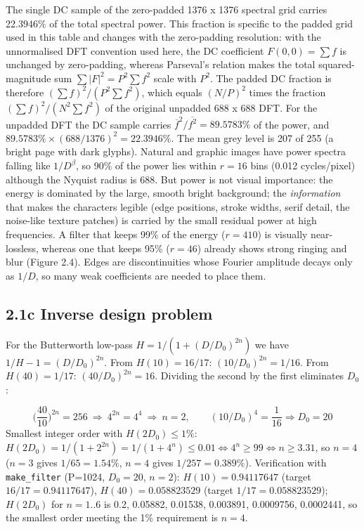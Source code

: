 \documentclass[10pt,a4paper]{article}
\begin{document}
The single DC sample of the zero-padded 1376 x 1376 spectral grid carries 22.3946\% of the total spectral power. This fraction is specific to the padded grid used in this table and changes with the zero-padding resolution: with the unnormalised DFT convention used here, the DC coefficient $F(0,0)=\sum f$ is unchanged by zero-padding, whereas Parseval's relation makes the total squared-magnitude sum $\sum|F|^2=P^2\sum f^2$ scale with $P^2$. The padded DC fraction is therefore $(\sum f)^2/(P^2\sum f^2)$, which equals $(N/P)^2$ times the fraction $(\sum f)^2/(N^2\sum f^2)$ of the original unpadded 688 x 688 DFT. For the unpadded DFT the DC sample carries $\overline{f}^{2}/\overline{f^2}=89.5783\%$ of the power, and $89.5783\%\times(688/1376)^2=22.3946\%$. The mean grey level is 207 of 255 (a bright page with dark glyphs). Natural and graphic images have power spectra falling like $1/D^{\beta}$, so 90\% of the power lies within $r=16$ bins (0.012 cycles/pixel) although the Nyquist radius is 688. But power is not visual importance: the energy is dominated by the large, smooth bright background; the \textit{information} that makes the characters legible (edge positions, stroke widths, serif detail, the noise-like texture patches) is carried by the small residual power at high frequencies. A filter that keeps 99\% of the energy ($r=410$) is visually near-lossless, whereas one that keeps 95\% ($r=46$) already shows strong ringing and blur (Figure 2.4). Edges are discontinuities whose Fourier amplitude decays only as $1/D$, so many weak coefficients are needed to place them.

\subsection{2.1c Inverse design problem}
For the Butterworth low-pass $H=1/(1+(D/D_0)^{2n})$ we have $1/H-1=(D/D_0)^{2n}$. From $H(10)=16/17$: $(10/D_0)^{2n}=1/16$. From $H(40)=1/17$: $(40/D_0)^{2n}=16$. Dividing the second by the first eliminates $D_0$:

\begin{equation}\Big(\frac{40}{10}\Big)^{2n}=256\ \Rightarrow\ 4^{2n}=4^{4}\ \Rightarrow\ n=2,\qquad (10/D_0)^{4}=\frac1{16}\Rightarrow D_0=20\end{equation}
Smallest integer order with $H(2D_0)\le 1\%$: $H(2D_0)=1/(1+2^{2n})=1/(1+4^n)\le 0.01\iff 4^n\ge 99\iff n\ge 3.31$, so $n=4$ ($n=3$ gives $1/65=1.54\%$, $n=4$ gives $1/257=0.389\%$). Verification with \texttt{make\_\allowbreak{}filter} (P=1024, $D_0=20$, $n=2$): $H(10)=0.94117647$ (target $16/17=0.94117647$), $H(40)=0.058823529$ (target $1/17=0.058823529$); $H(2D_0)$ for $n=1..6$ is 0.2, 0.05882, 0.01538, 0.003891, 0.0009756, 0.0002441, so the smallest order meeting the 1\% requirement is $n=4$.
\end{document}
